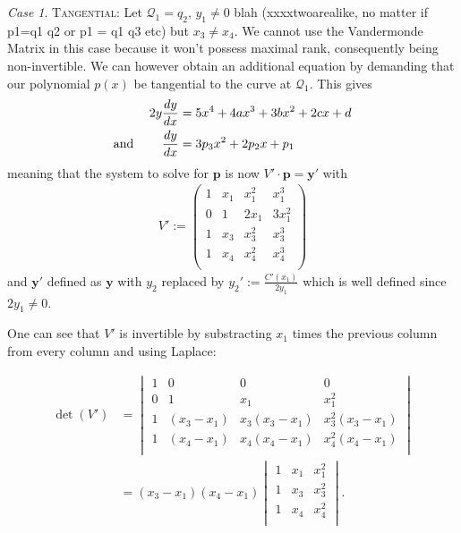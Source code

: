 \documentclass[english,11pt,a4paper]{article}
\theoremstyle{definition}
\theoremstyle{remark}
\theoremstyle{case}
\newtheorem{case}{Case}
\renewcommand{\P}{\mathbf{P}}
\newcommand{\q}{\mathcal{Q}}
\renewcommand{\bar}{\overline}
\begin{document}



\begin{case}
	{\scshape Tangential:} Let $\q_1 = q_2$, $y_1 \neq 0$ blah (xxxxtwoarealike, no matter if p1=q1 q2 or p1 = q1 q3 etc) but $x_3 \neq x_4$. We cannot use the Vandermonde Matrix in this case because it won't possess maximal rank, consequently being non-invertible. We can however obtain an additional equation by demanding that our polynomial $p(x)$ be tangential to the curve at $\q_1$. This gives %
	\begin{align*}
	  2 y \frac{dy}{dx} &= 5  x^4 + 4 a x^3 + 3 b x^2 + 2 c x + d \\
	  \text{and\hspace{8mm}} \frac{dy}{dx} &= 3 p_3 x^2 + 2 p_2 x + p_1
	\end{align*}
	meaning that the system to solve for $\mathbf{p}$ is now $V' \cdot \mathbf{p} = \mathbf{y'}$ with
	\begin{align*}V':=
		\begin{pmatrix}
			1 & x_1 & x_1^2 & x_1^3\\
			0 & 1 & 2 x_1 & 3 x_1^2\\
			1 & x_3 & x_3^2 & x_3^3\\
			1 & x_4 & x_4^2 & x_4^3\\
		\end{pmatrix}
	\end{align*}
	and $\mathbf{y'}$ defined as $\mathbf{y}$ with $y_2$ replaced by $y_2':=\frac{C'(x_1)}{2 y_1}$ which is well defined since $2y_1 \neq 0$.

	One can see that $V'$ is invertible by substracting $x_1$ times the previous column from every column and using Laplace:

	\begin{align*}\det (V') &=%
		\begin{vmatrix}
			1 & 0 & 0 & 0\\
			0 & 1 & x_1 & x_1^2\\
			1 & (x_3-x_1) & x_3(x_3-x_1) & x_3^2(x_3-x_1)\\
			1 & (x_4-x_1) & x_4(x_4-x_1) & x_4^2(x_4-x_1)\\
		\end{vmatrix}
		\\
		&= (x_3-x_1)(x_4-x_1)%
		\begin{vmatrix}
			1 & x_1 & x_1^2\\
			1 & x_3 & x_3^2\\
			1 & x_4 & x_4^2\\
		\end{vmatrix}.
	\end{align*}


\end{case}
\end{document}
